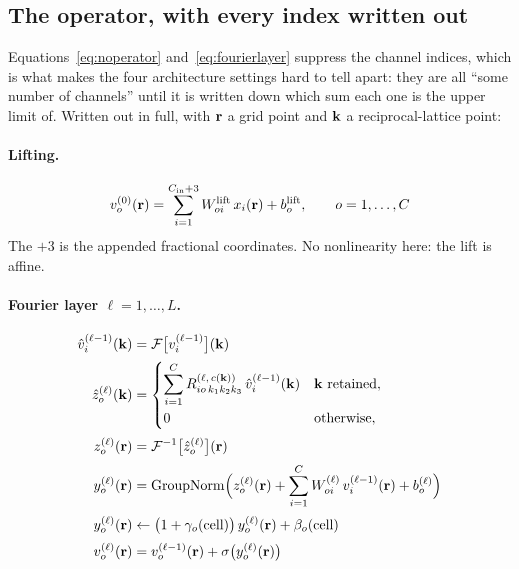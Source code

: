 \subsection{The operator, with every index written out}
\label{sec:indexed}

Equations~\eqref{eq:noperator} and~\eqref{eq:fourierlayer} suppress the channel
indices, which is what makes the four architecture settings hard to tell apart:
they are all ``some number of channels'' until it is written down which sum
each one is the upper limit of. Written out in full, with $\mathbf{r}$ a grid point
and $\mathbf{k}$ a reciprocal-lattice point:

\paragraph{Lifting.}
\begin{equation}
  v^{(0)}_{o}(\mathbf{r}) = \sum_{i=1}^{C_{\mathrm{in}}+3}
      W^{\mathrm{lift}}_{o i}\, x_{i}(\mathbf{r}) + b^{\mathrm{lift}}_{o},
  \qquad o = 1,\dots,C
  \label{eq:idx-lift}
\end{equation}
The $+3$ is the appended fractional coordinates. No nonlinearity here: the
lift is affine.

\paragraph{Fourier layer $\ell = 1,\dots,L$.}
\begin{align}
  \hat v^{(\ell-1)}_{i}(\mathbf{k})
    &= \mathcal{F}\bigl[v^{(\ell-1)}_{i}\bigr](\mathbf{k})
    \label{eq:idx-fft} \\[2pt]
  \hat z^{(\ell)}_{o}(\mathbf{k})
    &= \begin{cases}
         \displaystyle\sum_{i=1}^{C}
           R^{(\ell,\,c(\mathbf{k}))}_{i o\,k_1 k_2 k_3}\,\hat v^{(\ell-1)}_{i}(\mathbf{k})
           & \mathbf{k} \ \text{retained},\\[10pt]
         0 & \text{otherwise},
       \end{cases}
    \label{eq:idx-spectral} \\[2pt]
  z^{(\ell)}_{o}(\mathbf{r})
    &= \mathcal{F}^{-1}\bigl[\hat z^{(\ell)}_{o}\bigr](\mathbf{r})
    \label{eq:idx-ifft} \\[2pt]
  y^{(\ell)}_{o}(\mathbf{r})
    &= \mathrm{GroupNorm}\Bigl(
         z^{(\ell)}_{o}(\mathbf{r})
         + \sum_{i=1}^{C} W^{(\ell)}_{o i}\, v^{(\ell-1)}_{i}(\mathbf{r})
         + b^{(\ell)}_{o} \Bigr)
    \label{eq:idx-norm} \\[2pt]
  y^{(\ell)}_{o}(\mathbf{r})
    &\leftarrow \bigl(1 + \gamma_{o}(\text{cell})\bigr)\, y^{(\ell)}_{o}(\mathbf{r})
                + \beta_{o}(\text{cell})
    \label{eq:idx-film} \\[2pt]
  v^{(\ell)}_{o}(\mathbf{r})
    &= v^{(\ell-1)}_{o}(\mathbf{r}) + \sigma\bigl(y^{(\ell)}_{o}(\mathbf{r})\bigr)
    \label{eq:idx-residual}
\end{align}

